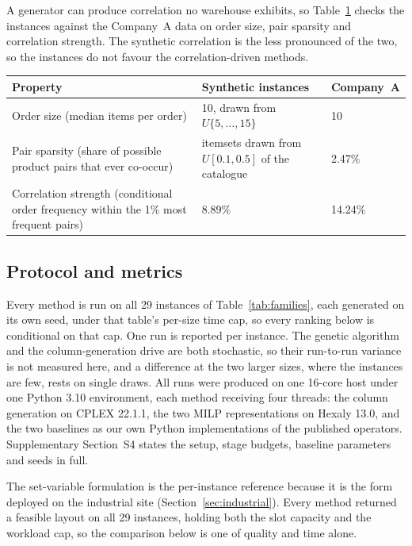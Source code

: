\documentclass[]{interact}
\begin{document}
A generator can produce correlation no warehouse exhibits, so Table~\ref{tab:realism} checks the instances against the Company~A data on order size, pair sparsity and correlation strength. The synthetic correlation is the less pronounced of the two, so the instances do not favour the correlation-driven methods.

\begin{table}[H]
\centering
{}
{\begin{tabularx}{\textwidth}{@{}Xll@{}}
\toprule
Property & Synthetic instances & Company~A \\
\midrule
Order size (median items per order) & 10, drawn from $U\{5,\dots,15\}$ & 10 \\
Pair sparsity (share of possible product pairs that ever co-occur) & itemsets drawn from $U[0.1,0.5]$ of the catalogue & 2.47\% \\
Correlation strength (conditional order frequency within the 1\% most frequent pairs) & 8.89\% & 14.24\% \\
\bottomrule
\end{tabularx}}
\label{tab:realism}
\end{table}

\subsection{Protocol and metrics}\label{sec:protocol}
Every method is run on all 29 instances of Table~\ref{tab:families}, each generated on its own seed, under that table's per-size time cap, so every ranking below is conditional on that cap. One run is reported per instance. The genetic algorithm and the column-generation drive are both stochastic, so their run-to-run variance is not measured here, and a difference at the two larger sizes, where the instances are few, rests on single draws. All runs were produced on one 16-core host under one Python 3.10 environment, each method receiving four threads: the column generation on CPLEX 22.1.1, the two MILP representations on Hexaly 13.0, and the two baselines as our own Python implementations of the published operators. Supplementary Section~S4 states the setup, stage budgets, baseline parameters and seeds in full.

The set-variable formulation is the per-instance reference because it is the form deployed on the industrial site (Section~\ref{sec:industrial}). Every method returned a feasible layout on all 29 instances, holding both the slot capacity and the workload cap, so the comparison below is one of quality and time alone.
\end{document}
